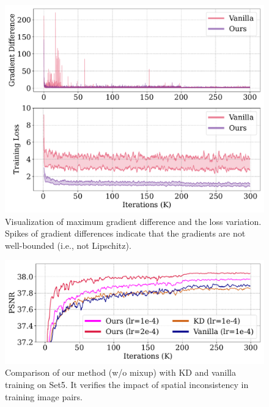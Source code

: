 \documentclass[letterpaper]{article} %
\begin{document}
\begin{figure}[t]
    \begin{center}
    \includegraphics[width=\columnwidth]{figures/optimization_landscape.pdf}
    \end{center}
    \vspace{-10pt}
    \caption{
    Visualization of maximum gradient difference and the loss variation. Spikes of gradient differences indicate that the gradients are not well-bounded (i.e., not Lipschitz).
    }
    \label{fig:optimization_landscape}
\end{figure}

\begin{figure}[t]
    \begin{center}
    \includegraphics[width=\columnwidth]{figures/different_training_schemes.pdf}
    \end{center}
    \vspace{-10pt}
    \caption{
    Comparison of our method (w/o mixup) with KD and vanilla training on Set5. It verifies the impact of spatial inconsistency in training image pairs.
    }
    \vspace{-5pt}
    \label{fig:different_training_schemes}
\end{figure}
%
\end{document}
